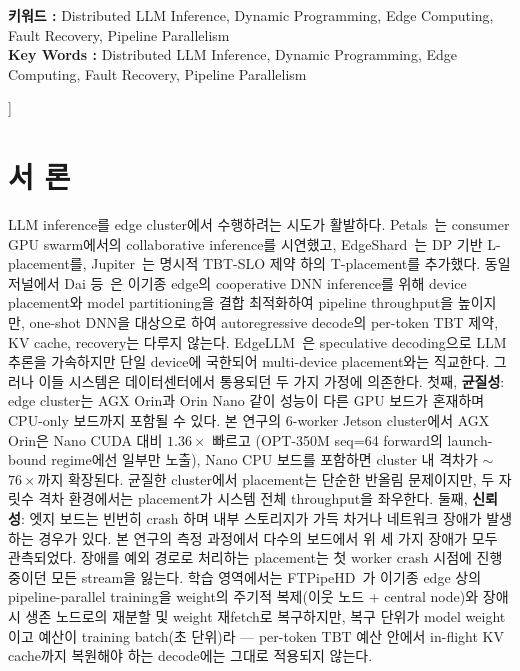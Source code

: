\documentclass[10pt,twocolumn,a4paper]{article}
\begin{document}
\begin{@twocolumnfalse}
\begin{center}
\begin{minipage}{0.92\textwidth}
      \vspace{0.4em}
      \noindent\textbf{키워드 :} Distributed LLM Inference, Dynamic Programming, Edge Computing, Fault Recovery, Pipeline Parallelism\\
      \noindent\textbf{Key Words :} Distributed LLM Inference, Dynamic Programming, Edge Computing, Fault Recovery, Pipeline Parallelism
    \end{minipage}
  \end{center}
  \vspace{1.5em}
  \end{@twocolumnfalse}%
]

\section{서  론}\label{sec:intro}

LLM inference를 edge cluster에서 수행하려는 시도가 활발하다.
Petals~\cite{borzunov2023petals,borzunov2023distributed}는 consumer
GPU swarm에서의 collaborative inference를 시연했고,
EdgeShard~\cite{zhang2024edgeshard}는 DP 기반 L-placement를,
Jupiter~\cite{ye2025jupiter}는 명시적 TBT-SLO 제약 하의
T-placement를 추가했다. 동일 저널에서 Dai 등~\cite{dai2025joint}은
이기종 edge의 cooperative DNN inference를 위해 device placement와
model partitioning을 결합 최적화하여 pipeline throughput을 높이지만,
one-shot DNN을 대상으로 하여 autoregressive decode의 per-token TBT
제약, KV cache, recovery는 다루지 않는다. EdgeLLM~\cite{xu2025edgellm}은
speculative decoding으로 LLM 추론을 가속하지만 단일 device에 국한되어
multi-device placement와는 직교한다. 그러나 이들 시스템은
데이터센터에서 통용되던 두 가지 가정에 의존한다.
첫째, \textbf{균질성}: edge cluster는 AGX Orin과 Orin Nano 같이
성능이 다른 GPU 보드가 혼재하며 CPU-only 보드까지 포함될 수
있다. 본 연구의 6-worker Jetson cluster에서 AGX Orin은 Nano CUDA
대비 $1.36\times$ 빠르고 (OPT-350M seq=64 forward의 launch-bound
regime에선 일부만 노출), Nano CPU 보드를 포함하면 cluster 내 격차가
$\sim$$76\times$까지 확장된다. 균질한 cluster에서 placement는
단순한 반올림 문제이지만, 두 자릿수 격차 환경에서는 placement가
시스템 전체 throughput을 좌우한다. 둘째, \textbf{신뢰성}: 엣지 보드는 빈번히
crash 하며 내부 스토리지가 가득 차거나 네트워크 장애가 발생하는 경우가 있다. 본 연구의
측정 과정에서 다수의 보드에서 위 세 가지 장애가 모두
관측되었다. 장애를 예외 경로로 처리하는 placement는 첫 worker crash
시점에 진행 중이던 모든 stream을 잃는다.
학습 영역에서는 FTPipeHD~\cite{chen2024ftpipehd}가 이기종 edge 상의
pipeline-parallel training을 weight의 주기적 복제(이웃 노드 + central
node)와 장애 시 생존 노드로의 재분할 및 weight 재fetch로 복구하지만,
복구 단위가 model weight이고 예산이 training batch(초 단위)라 ---
per-token TBT 예산 안에서 in-flight KV cache까지 복원해야 하는
decode에는 그대로 적용되지 않는다.
\end{document}
